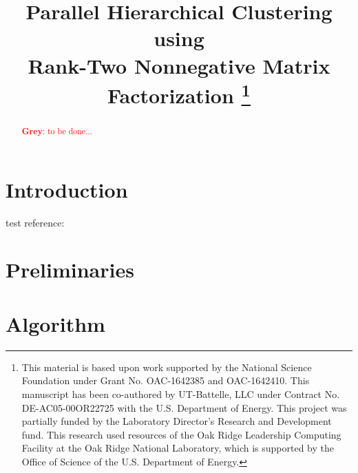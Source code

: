 \documentclass[conference,compsoc]{IEEEtran}
\newcommand{\GB}[1]{\textcolor{red}{\textbf{Grey}: #1}}
\begin{document}
\title{Parallel Hierarchical Clustering using \\ Rank-Two Nonnegative Matrix Factorization
\thanks{This material is based upon work supported by the National Science Foundation under Grant No. OAC-1642385 and OAC-1642410.
This manuscript has been co-authored by UT-Battelle, LLC under Contract No. DE-AC05-00OR22725 with the U.S. Department of
Energy. This project was partially funded by the Laboratory Director's Research and Development fund. This research used resources
of the Oak Ridge Leadership Computing Facility at the Oak Ridge National Laboratory, which is supported by the Office of Science of
the U.S. Department of Energy.}
}

\author{
\and
{}
\and
{}
}

\maketitle

\begin{abstract}
\GB{to be done...}
\end{abstract}


\section{Introduction}

test reference: \cite{GKP15}

\section{Preliminaries}

\section{Algorithm}
\end{document}
